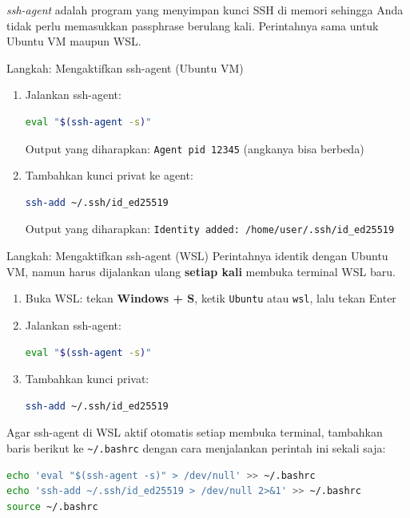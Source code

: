 \documentclass[
    a4paper,
    11pt,
    parskip=half
]{scrartcl}
\begin{document}
\textit{ssh-agent} adalah program yang menyimpan kunci SSH di memori sehingga Anda tidak perlu memasukkan passphrase berulang kali. Perintahnya sama untuk Ubuntu VM maupun WSL.

\begin{stepbox}{Langkah: Mengaktifkan ssh-agent (Ubuntu VM)}
\begin{enumerate}
    \item Jalankan ssh-agent:
\begin{lstlisting}[language=bash]
eval "$(ssh-agent -s)"
\end{lstlisting}
    Output yang diharapkan: \texttt{Agent pid 12345} (angkanya bisa berbeda)

    \item Tambahkan kunci privat ke agent:
\begin{lstlisting}[language=bash]
ssh-add ~/.ssh/id_ed25519
\end{lstlisting}
    Output yang diharapkan: \texttt{Identity added: /home/user/.ssh/id\_ed25519}
\end{enumerate}
\end{stepbox}

\begin{stepbox}{Langkah: Mengaktifkan ssh-agent (WSL)}
Perintahnya identik dengan Ubuntu VM, namun harus dijalankan ulang \textbf{setiap kali} membuka terminal WSL baru.
\begin{enumerate}
    \item Buka WSL: tekan \textbf{Windows + S}, ketik \texttt{Ubuntu} atau \texttt{wsl}, lalu tekan Enter
    \item Jalankan ssh-agent:
\begin{lstlisting}[language=bash]
eval "$(ssh-agent -s)"
\end{lstlisting}
    \item Tambahkan kunci privat:
\begin{lstlisting}[language=bash]
ssh-add ~/.ssh/id_ed25519
\end{lstlisting}
\end{enumerate}
\end{stepbox}

\begin{tipbox}
Agar ssh-agent di WSL aktif otomatis setiap membuka terminal, tambahkan baris berikut ke \texttt{\textasciitilde/.bashrc} dengan cara menjalankan perintah ini sekali saja:
\begin{lstlisting}[language=bash]
echo 'eval "$(ssh-agent -s)" > /dev/null' >> ~/.bashrc
echo 'ssh-add ~/.ssh/id_ed25519 > /dev/null 2>&1' >> ~/.bashrc
source ~/.bashrc
\end{lstlisting}
\end{tipbox}
\end{document}
